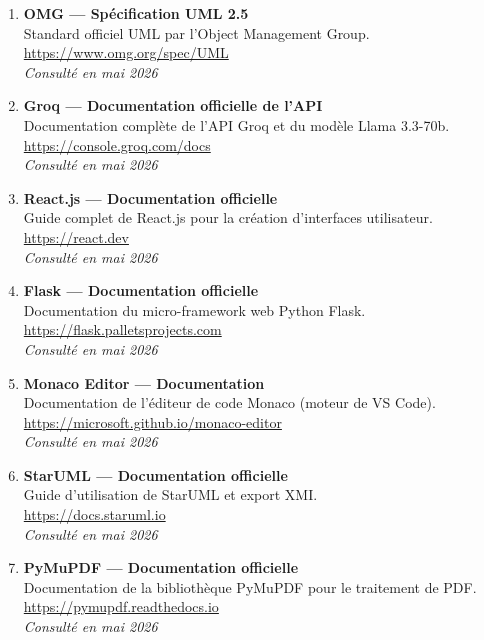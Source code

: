 \begin{enumerate}
\item \textbf{OMG — Spécification UML 2.5}\\
Standard officiel UML par l'Object Management Group.\\
\url{https://www.omg.org/spec/UML}\\
\textit{Consulté en mai 2026}

\item \textbf{Groq — Documentation officielle de l'API}\\
Documentation complète de l'API Groq et du modèle Llama 3.3-70b.\\
\url{https://console.groq.com/docs}\\
\textit{Consulté en mai 2026}

\item \textbf{React.js — Documentation officielle}\\
Guide complet de React.js pour la création d'interfaces utilisateur.\\
\url{https://react.dev}\\
\textit{Consulté en mai 2026}

\item \textbf{Flask — Documentation officielle}\\
Documentation du micro-framework web Python Flask.\\
\url{https://flask.palletsprojects.com}\\
\textit{Consulté en mai 2026}

\item \textbf{Monaco Editor — Documentation}\\
Documentation de l'éditeur de code Monaco (moteur de VS Code).\\
\url{https://microsoft.github.io/monaco-editor}\\
\textit{Consulté en mai 2026}

\item \textbf{StarUML — Documentation officielle}\\
Guide d'utilisation de StarUML et export XMI.\\
\url{https://docs.staruml.io}\\
\textit{Consulté en mai 2026}

\item \textbf{PyMuPDF — Documentation officielle}\\
Documentation de la bibliothèque PyMuPDF pour le traitement de PDF.\\
\url{https://pymupdf.readthedocs.io}\\
\textit{Consulté en mai 2026}


\end{enumerate}
